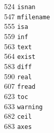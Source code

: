 \begin{footnotesize}
\begin{multicols}{3}
\vspace{-.153cm} 524   \hspace{.2cm} {\tt isnan               }     \\ %
\vspace{-.153cm} 547   \hspace{.2cm} {\tt mfilename           }     \\ %
\vspace{-.153cm} 555   \hspace{.2cm} {\tt isa                 }     \\ %
\vspace{-.153cm} 559   \hspace{.2cm} {\tt inf                 }     \\ %
\vspace{-.153cm} 563   \hspace{.2cm} {\tt text                }     \\ %
\vspace{-.153cm} 564   \hspace{.2cm} {\tt exist               }     \\ %
\vspace{-.153cm} 583   \hspace{.2cm} {\tt diff                }     \\ %
\vspace{-.153cm} 590   \hspace{.2cm} {\tt real                }     \\ %
\vspace{-.153cm} 607   \hspace{.2cm} {\tt fread               }     \\ %
\vspace{-.153cm} 623   \hspace{.2cm} {\tt toc                 }     \\ %
\vspace{-.153cm} 633   \hspace{.2cm} {\tt warning             }     \\ %
\vspace{-.153cm} 682   \hspace{.2cm} {\tt ceil                }     \\ %
\vspace{-.153cm} 683   \hspace{.2cm} {\tt axes                }     \\ %

\end{multicols}
\end{footnotesize}

